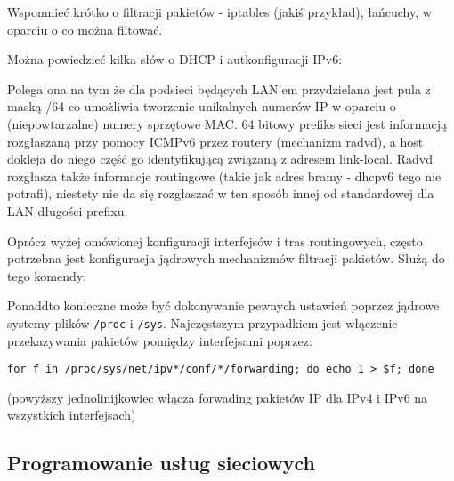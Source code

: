 \documentclass{pdfBooklets}
\begin{document}
\begin{teacherOnly}
	Wspomnieć krótko o filtracji pakietów - iptables (jakiś przykład), łańcuchy, w oparciu o co można filtować.
	
	Można powiedzieć kilka słów o DHCP i autkonfiguracji IPv6:
	
	Polega ona na tym że dla podsieci będących LAN'em przydzielana jest pula z maską /64 co umożliwia tworzenie unikalnych numerów IP w oparciu o (niepowtarzalne) numery sprzętowe MAC.
	64 bitowy prefiks sieci jest informacją rozgłaszaną przy pomocy ICMPv6 przez routery (mechanizm radvd), a host dokleja do niego część go identyfikującą związaną z adresem link-local.
	Radvd rozgłasza także informacje routingowe (takie jak adres bramy - dhcpv6 tego nie potrafi), niestety nie da się rozgłaszać w ten sposób innej od standardowej dla LAN długości prefixu.
\end{teacherOnly}

Oprócz wyżej omówionej konfiguracji interfejsów i tras routingowych, często potrzebna jest konfiguracja jądrowych mechanizmów filtracji pakietów. Służą do tego komendy:

Ponaddto konieczne może być dokonywanie pewnych ustawień poprzez jądrowe systemy plików \Verb$/proc$ i \Verb$/sys$.
Najczęstszym przypadkiem jest włączenie przekazywania pakietów pomiędzy interfejsami poprzez:

\begin{verbatim}
for f in /proc/sys/net/ipv*/conf/*/forwarding; do echo 1 > $f; done
\end{verbatim}
(powyższy jednolinijkowiec włącza forwading pakietów IP dla IPv4 i IPv6 na wszystkich interfejsach)


\subsection{Programowanie usług sieciowych}
\end{document}
